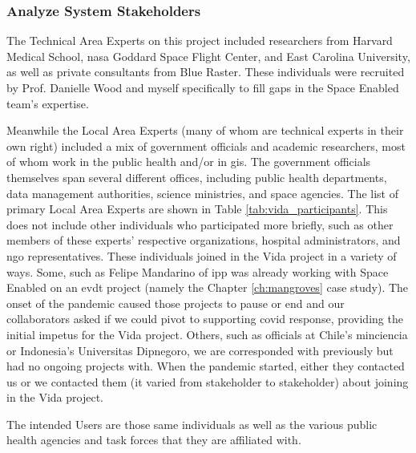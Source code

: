 

\subsubsection{Analyze System Stakeholders}

The Technical Area Experts on this project included researchers from Harvard Medical School, \ac{nasa} Goddard Space Flight Center, and East Carolina University, as well as private consultants from Blue Raster. These individuals were recruited by Prof. Danielle Wood and myself specifically to fill gaps in the Space Enabled team's expertise.

Meanwhile the Local Area Experts (many of whom are technical experts in their own right) included a mix of government officials and academic researchers, most of whom work in the public health and/or in \ac{gis}. The government officials themselves span several different offices, including public health departments, data management authorities, science ministries, and space agencies. The list of primary Local Area Experts are shown in Table \ref{tab:vida_participants}. This does not include other individuals who participated more briefly, such as other members of these experts' respective organizations, hospital administrators, and \ac{ngo} representatives. These individuals joined in the Vida project in a variety of ways. Some, such as Felipe Mandarino of \ac{ipp} was already working with Space Enabled on an \ac{evdt} project (namely the Chapter \ref{ch:mangroves} case study). The onset of the pandemic caused those projects to pause or end and our collaborators asked if we could pivot to supporting \ac{covid} response, providing the initial impetus for the Vida project. Others, such as officials at Chile's \ac{minciencia} or Indonesia's Universitas Dipnegoro, we are corresponded with previously but had no ongoing projects with. When the pandemic started, either they contacted us or we contacted them (it varied from stakeholder to stakeholder) about joining in the Vida project.

The intended Users are those same individuals as well as the various public health agencies and task forces that they are affiliated with.  

